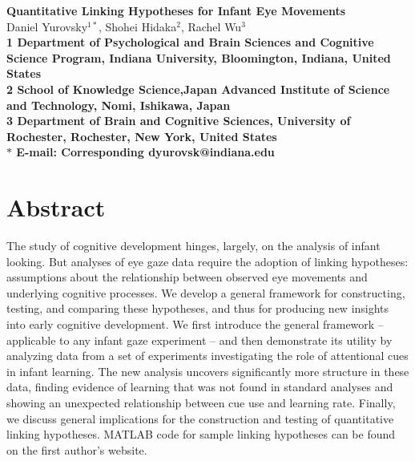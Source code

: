 \documentclass[12pt]{article}
\date{}
\begin{document}
\begin{flushleft}
{\Large
\textbf{Quantitative Linking Hypotheses for Infant Eye Movements}
}
\\
Daniel Yurovsky$^{1\ast}$, 
Shohei Hidaka$^{2}$, 
Rachel Wu$^{3}$
\\
\bf{1} Department of Psychological and Brain Sciences and Cognitive Science Program, Indiana University, Bloomington, Indiana, United States
\\
\bf{2} School of Knowledge Science,Japan Advanced Institute of Science and Technology, Nomi, Ishikawa, Japan
\\
\bf{3} Department of Brain and Cognitive Sciences, University of Rochester, Rochester, New York, United States
\\
$\ast$ E-mail: Corresponding dyurovsk@indiana.edu
\end{flushleft}

\section*{Abstract}
The study of cognitive development hinges, largely, on the analysis of infant looking. But analyses of eye gaze data require the adoption of linking hypotheses: assumptions about the relationship between observed eye movements and underlying cognitive processes. We develop a general framework for constructing, testing, and comparing these hypotheses, and thus for producing new insights into early cognitive development. We first introduce the general framework – applicable to any infant gaze experiment – and then demonstrate its utility by analyzing data from a set of experiments investigating the role of attentional cues in infant learning. The new analysis uncovers significantly more structure in these data, finding evidence of learning that was not found in standard analyses and showing an unexpected relationship between cue use and learning rate. Finally, we discuss general implications for the construction and testing of quantitative linking hypotheses. MATLAB code for sample linking hypotheses can be found on the first author’s website.

\end{document}
